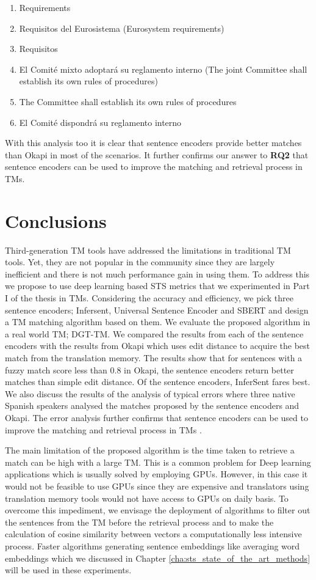 \begin{enumerate}[resume,label={(\arabic*)}]
\item	Requirements
\item	Requisitos del Eurosistema (Eurosystem requirements)
\item	Requisitos
\item	El Comité mixto adoptará su reglamento interno (The joint Committee shall establish its own rules of procedures)
\item	The Committee shall establish its own rules of procedures
\item	El Comité dispondrá su reglamento interno
\end{enumerate}

With this analysis too it is clear that sentence encoders provide better matches than Okapi in most of the scenarios. It further confirms our answer to \textbf{RQ2} that sentence encoders can be used to improve the matching and retrieval process in TMs.

\section{Conclusions}
Third-generation TM tools have addressed the limitations in traditional TM tools. Yet, they are not popular in the community since they are largely inefficient and there is not much performance gain in using them. To address this we propose to use deep learning based STS metrics that we experimented in Part I of the thesis in TMs. Considering the accuracy and efficiency, we pick three sentence encoders; Infersent, Universal Sentence Encoder and SBERT and design a TM matching algorithm based on them. We evaluate the proposed algorithm in a real world TM; DGT-TM. We compared the results from each of the sentence encoders with the results from Okapi which uses edit distance to acquire the best match from the translation memory. The results show that for sentences with a fuzzy match score less than 0.8 in Okapi, the sentence encoders return better matches than simple edit distance. Of the sentence encoders, InferSent fares best. We also discuss the results of the analysis of typical errors where three native Spanish speakers analysed the matches proposed by the sentence encoders and Okapi. The error analysis further confirms that sentence encoders can be used to improve the matching and retrieval process in TMs \autocite{ranasinghe-etal-2020-intelligent}. 

The main limitation of the proposed algorithm is the time taken to retrieve a match can be high with a large TM. This is a common problem for Deep learning applications which is usually solved by employing GPUs. However, in this case it would not be feasible to use GPUs since they are expensive and translators using translation memory tools would not have access to GPUs on daily basis. To overcome this impediment, we envisage the deployment of algorithms to filter out the sentences from the TM before the retrieval process and to make the calculation of cosine similarity between vectors a computationally less intensive process. Faster algorithms generating sentence embeddings like averaging word embeddings which we discussed in Chapter \ref{cha:sts_state_of_the_art_methods} will be used in these experiments. 

